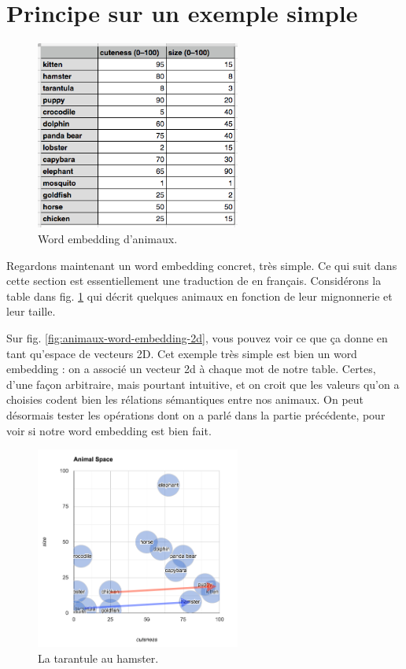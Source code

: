 \documentclass[11pt, a4paper]{report}
\begin{document}
  \section{Principe sur un exemple simple}

  \begin{figure}[h]
    \centering
    \includegraphics[width=0.6\textwidth]{animal-table.png}
    \caption{Word embedding d'animaux.}
    \label{fig:animaux-word-embedding}
  \end{figure}

Regardons maintenant un word embedding concret, très simple. Ce qui suit dans cette 
section est essentiellement une 
traduction de \cite[\textit{Understanding word vectors}, Allison PARISH]{understanding-word-vectors} 
en français. Considérons la table dans fig. \ref{fig:animaux-word-embedding} qui décrit quelques 
animaux en fonction de leur mignonnerie et leur taille. 

Sur fig. \ref{fig:animaux-word-embedding-2d}, vous pouvez voir 
ce que ça donne en tant qu'espace de vecteurs 2D. 
Cet exemple très simple est bien un word embedding : on a associé un vecteur 2d à chaque mot 
de notre table. Certes, d'une façon arbitraire, mais pourtant intuitive, et on croit que les 
valeurs qu'on a choisies codent bien les rélations sémantiques entre nos animaux. On peut désormais 
tester les opérations dont on a parlé dans la partie précédente, pour voir si notre word embedding 
est bien fait. 
\begin{figure}[!htb]
  \centering
  \includegraphics[width=0.6\textwidth]{animal-space-dif.png}
  \caption{La tarantule au hamster.}
  \label{fig:tarantule-hamster}
\end{figure}
\end{document}
